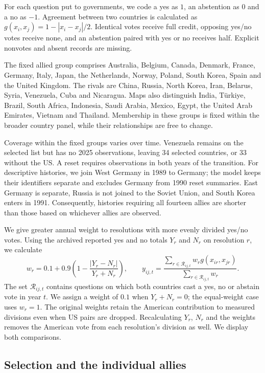 \documentclass[10pt,authoryear]{elsarticle}
\begin{document}
For each question put to governments, we code a yes as $1$, an abstention as $0$ and a no as $-1$. Agreement between two countries is calculated as $g(x_i,x_j)=1-|x_i-x_j|/2$. Identical votes receive full credit, opposing yes/no votes receive none, and an abstention paired with yes or no receives half. Explicit nonvotes and absent records are missing.

The fixed allied group comprises Australia, Belgium, Canada, Denmark, France, Germany, Italy, Japan, the Netherlands, Norway, Poland, South Korea, Spain and the United Kingdom. The rivals are China, Russia, North Korea, Iran, Belarus, Syria, Venezuela, Cuba and Nicaragua. Maps also distinguish India, T\"urkiye, Brazil, South Africa, Indonesia, Saudi Arabia, Mexico, Egypt, the United Arab Emirates, Vietnam and Thailand. Membership in these groups is fixed within the broader country panel, while their relationships are free to change.

Coverage within the fixed groups varies over time. Venezuela remains on the selected list but has no 2025 observations, leaving 34 selected countries, or 33 without the US. A reset requires observations in both years of the transition. For descriptive histories, we join West Germany in 1989 to Germany; the model keeps their identifiers separate and excludes Germany from 1990 reset summaries. East Germany is separate, Russia is not joined to the Soviet Union, and South Korea enters in 1991. Consequently, histories requiring all fourteen allies are shorter than those based on whichever allies are observed.

We give greater annual weight to resolutions with more evenly divided yes/no votes. Using the archived reported yes and no totals $Y_r$ and $N_r$ on resolution $r$, we calculate
\[
w_r=0.1+0.9\left(1-\frac{|Y_r-N_r|}{Y_r+N_r}\right),\qquad
 y_{ij,t}=\frac{\sum_{r\in\mathcal R_{ij,t}}w_r g(x_{ir},x_{jr})}{\sum_{r\in\mathcal R_{ij,t}}w_r}.
\]
The set $\mathcal R_{ij,t}$ contains questions on which both countries cast a yes, no or abstain vote in year $t$. We assign a weight of $0.1$ when $Y_r+N_r=0$; the equal-weight case uses $w_r=1$. The original weights retain the American contribution to measured divisions even when US pairs are dropped. Recalculating $Y_r$, $N_r$ and the weights removes the American vote from each resolution’s division as well. We display both comparisons.

\subsection{Selection and the individual allies}
\end{document}
